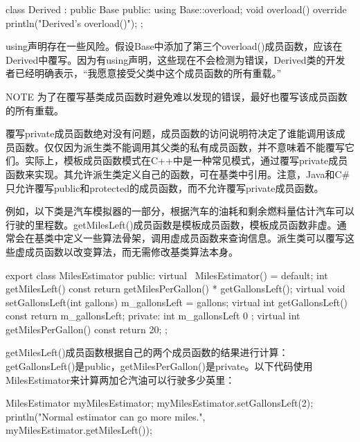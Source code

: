 \begin{cpp}
class Derived : public Base
{
    public:
        using Base::overload;
        void overload() override { println("Derived's overload()"); }
};
\end{cpp}

using声明存在一些风险。假设Base中添加了第三个overload()成员函数，应该在Derived中覆写。因为有using声明，这些现在不会检测为错误，Derived类的开发者已经明确表示，“我愿意接受父类中这个成员函数的所有重载。”

\begin{myNotic}{NOTE}
为了在覆写基类成员函数时避免难以发现的错误，最好也覆写该成员函数的所有重载。
\end{myNotic}


覆写private成员函数绝对没有问题，成员函数的访问说明符决定了谁能调用该成员函数。仅仅因为派生类不能调用其父类的私有成员函数，并不意味着不能覆写它们。实际上，模板成员函数模式在C++中是一种常见模式，通过覆写private成员函数来实现。其允许派生类定义自己的函数，可在基类中引用。注意，Java和C\#只允许覆写public和protected的成员函数，而不允许覆写private成员函数。

例如，以下类是汽车模拟器的一部分，根据汽车的油耗和剩余燃料量估计汽车可以行驶的里程数。getMilesLeft()成员函数是模板成员函数，模板成员函数非虚。通常会在基类中定义一些算法骨架，调用虚成员函数来查询信息。派生类可以覆写这些虚成员函数以改变算法，而无需修改基类算法本身。

\begin{cpp}
export class MilesEstimator
{
    public:
        virtual ~MilesEstimator() = default;
        int getMilesLeft() const { return getMilesPerGallon() * getGallonsLeft(); }
        virtual void setGallonsLeft(int gallons) { m_gallonsLeft = gallons; }
        virtual int getGallonsLeft() const { return m_gallonsLeft; }
    private:
        int m_gallonsLeft { 0 };
        virtual int getMilesPerGallon() const { return 20; }
};
\end{cpp}

getMilesLeft()成员函数根据自己的两个成员函数的结果进行计算：getGallonsLeft()是public，getMilesPerGallon()是private。以下代码使用MilesEstimator来计算两加仑汽油可以行驶多少英里：

\begin{cpp}
MilesEstimator myMilesEstimator;
myMilesEstimator.setGallonsLeft(2);
println("Normal estimator can go {} more miles.",
    myMilesEstimator.getMilesLeft());
\end{cpp}

